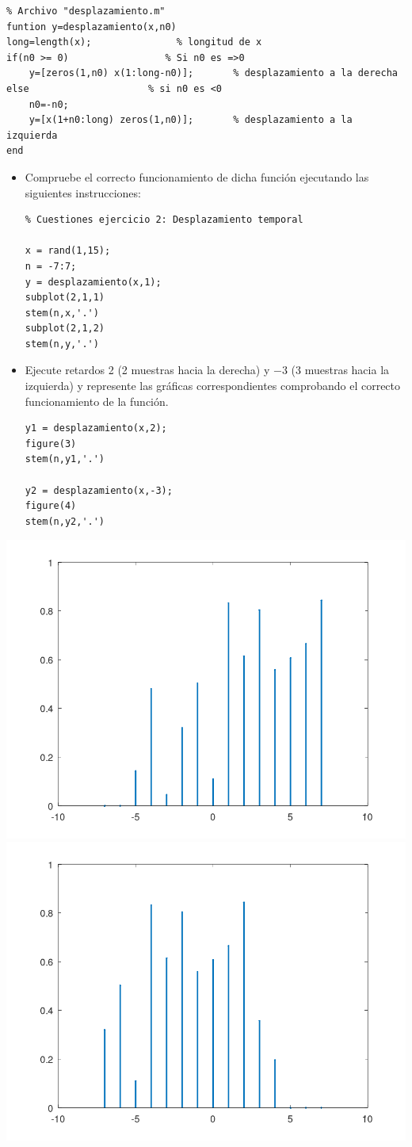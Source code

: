 \documentclass{article}
\begin{document}
\begin{lstlisting}
% Archivo "desplazamiento.m"
funtion y=desplazamiento(x,n0)
long=length(x);               % longitud de x
if(n0 >= 0)                 % Si n0 es =>0
	y=[zeros(1,n0) x(1:long-n0)];       % desplazamiento a la derecha
else                     % si n0 es <0
	n0=-n0;
	y=[x(1+n0:long) zeros(1,n0)];       % desplazamiento a la izquierda
end
\end{lstlisting}
\begin{itemize}[label=$-$]
	\item Compruebe el correcto funcionamiento de dicha función ejecutando las siguientes instrucciones:
	
	\begin{lstlisting}
% Cuestiones ejercicio 2: Desplazamiento temporal

x = rand(1,15);
n = -7:7;
y = desplazamiento(x,1);
subplot(2,1,1)
stem(n,x,'.')
subplot(2,1,2)
stem(n,y,'.')
	\end{lstlisting}
	\item Ejecute retardos 2 (2 muestras hacia la derecha) y $-3$ (3 muestras hacia la izquierda) y represente las gráficas correspondientes comprobando el correcto funcionamiento de la función.
	
	\begin{lstlisting}
y1 = desplazamiento(x,2);
figure(3)
stem(n,y1,'.')

y2 = desplazamiento(x,-3);
figure(4)
stem(n,y2,'.')
	\end{lstlisting}
\end{itemize}


\begin{center}
\includegraphics[width=0.45\linewidth]{Imagénes/figure3}
\qquad
\includegraphics[width=0.45\linewidth]{Imagénes/figure4}
\end{center}
\end{document}
